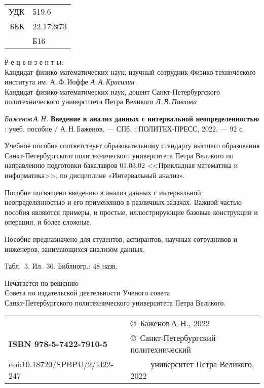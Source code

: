 \documentclass[a5paper,openany]{book}
\begin{document}
\newpage
{\small 
\begin{tabular}{rl}
	УДК & 519.6 \\	
	ББК  & 22.172я73\\
	~~~ & Б16
\end{tabular}


\begin{center}
Р е ц е н з е н т ы:\\

Кандидат физико-математических наук, научный сотрудник Физико-технического института им. А.\,Ф.\,Иоффе
{\it А.\,А.\,Красилин}\\
Кандидат физико-математических наук, доцент Санкт-Петербургского политехнического  университета  Петра Великого {\it Л.\,В.\,Павлова}
 \end{center}

{\it Баженов\,А.\,Н.}
{\bf Введение в анализ данных с интервальной неопределенностью} : учеб. пособие /  А.\,Н.\,Баженов.
--- СПб. : ПОЛИТЕХ-ПРЕСС, 2022. --- 92 с.
\hfill \break

	Учебное пособие соответствует образовательному стандарту высшего
образования Санкт-Петербургского политехнического университета Петра Великого по направлению подготовки бакалавров 01.03.02 <<Прикладная математика и информатика>>, по дисциплине «Интервальный анализ».


Пособие посвящено введению в анализ данных с интервальной неопределенностью
и его применению в различных задачах.  
Важной частью пособия являются примеры, и простые, иллюстрирующие базовые конструкции и операции, и более сложные.

Пособие предназначено для студентов, аспирантов, научных сотрудников и инженеров, 
занимающихся анализом данных.


Табл.~3. Ил.~36. Библиогр.: 48 назв.
\hfill \break
\hfill \break

 \begin{center}
Печатается по решению\\
Совета по издательской деятельности Ученого совета\\
Санкт-Петербургского политехнического  университета Петра Великого. %
 \end{center}

\hfill \break
\begin{tabular}{ll}
	~ & \copyright  \ Баженов\,А.\,Н., 2022 \\
{\bf ISBN 978-5-7422-7910-5} & \copyright \
Санкт-Петербургский политехнический \\
doi:10.18720/SPBPU/2/id22-247 & ~~~~~университет Петра Великого, 2022
\end{tabular}
}
\end{document}
